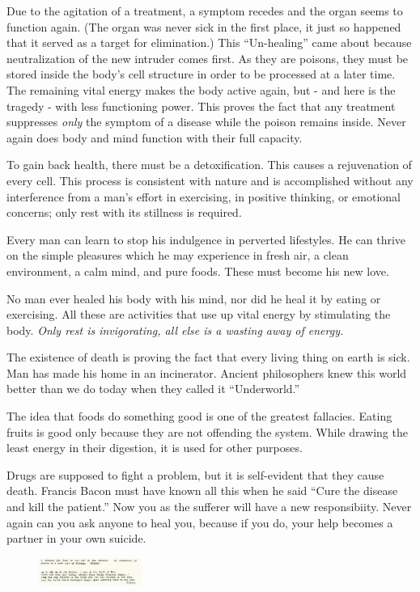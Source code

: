 \documentclass[landscape,twocolumn,letterpaper]{article}
\begin{document}
Due to the agitation of a treatment, a symptom recedes and the organ
seems to function again. (The organ was never sick in the first place,
it just so happened that it served as a target for elimination.) This
``Un-healing'' came about because neutralization of the new intruder
comes first. As they are poisons, they must be stored inside the
body's cell structure in order to be processed at a later time. The
remaining vital energy makes the body active again, but - and here is
the tragedy - with less functioning power. This proves the fact that
any treatment suppresses \emph{only} the symptom of a disease while
the poison remains inside. Never again does body and mind function
with their full capacity.

To gain back health, there must be a detoxification. This causes a
rejuvenation of every cell. This process is consistent with nature and
is accomplished without any interference from a man's effort in
exercising, in positive thinking, or emotional concerns; only rest
with its stillness is required.

Every man can learn to stop his indulgence in perverted lifestyles. He
can thrive on the simple pleasures which he may experience in fresh
air, a clean environment, a calm mind, and pure foods. These must
become his new love.

No man ever healed his body with his mind, nor did he heal it by
eating or exercising. All these are activities that use up vital
energy by stimulating the body. \emph{Only rest is invigorating, all
else is a wasting away of energy.}

The existence of death is proving the fact that every living thing on
earth is sick. Man has made his home in an incinerator. Ancient
philosophers knew this world better than we do today when they called
it ``Underworld.''

The idea that foods do something good is one of the greatest
fallacies. Eating fruits is good only because they are not offending
the system. While drawing the least energy in their digestion, it is
used for other purposes.

Drugs are supposed to fight a problem, but it is self-evident that
they cause death. Francis Bacon must have known all this when he said
``Cure the disease and kill the patient.'' Now you as the sufferer
will have a new responsibiity. Never again can you ask anyone to heal
you, because if you do, your help becomes a partner in your own
suicide.

\begin{figure} \centering
  \includegraphics[width=0.3\textwidth,bb= 0 0 422 113]{p26quotes.jpg}
\end{figure}
\end{document}
